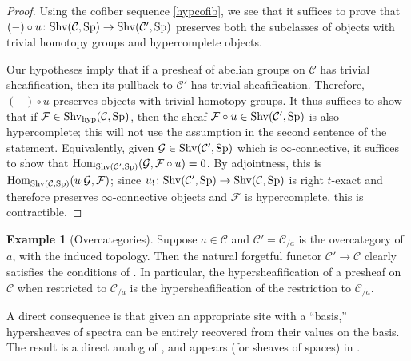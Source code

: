 \documentclass{amsart}
\newcommand{\sF}{\mathcal{F}}
\renewcommand{\sp}{\mathrm{Sp}}
\renewcommand{\hom}{\mathrm{Hom}}
\theoremstyle{definition}
\newtheorem{example}[theorem]{Example}
\begin{document}
\begin{proof} 
Using the cofiber sequence \eqref{hypcofib}, we see that it suffices to prove
that $(-) \circ u \colon  \shv( \mathcal{C}, \sp) \to \shv(\mathcal{C}', \sp)$
preserves both the subclasses of objects with trivial homotopy groups and
hypercomplete objects. 


Our hypotheses imply that 
if a presheaf of abelian groups on $\mathcal{C}$ has trivial sheafification,
then 
its pullback to $\mathcal{C}'$ has trivial sheafification. 
Therefore, $(-) \circ u $ preserves objects with trivial homotopy groups. 
 It thus suffices to show that if $\sF \in \shvh(\mathcal{C}, \sp)$,
then the sheaf $\sF \circ u \in \shv(\mathcal{C}', \sp)$ is also hypercomplete;
this will not use the assumption in the second sentence of the statement.
Equivalently,  given $\mathcal{G} \in \shv(\mathcal{C}', 
\sp)$ which is $\infty$-connective, it suffices to show that $\hom_{\shv(\mathcal{C}', \sp)}(\mathcal{G}, \sF
\circ u) =0 $.  
By adjointness, this is $\hom_{\shv(\mathcal{C}, \sp)} ( u_! \mathcal{G},
\sF)$; since $u_! \colon \shv(\mathcal{C}', \sp) \to \shv(\mathcal{C}, \sp)$ is right $t$-exact and therefore preserves $\infty$-connective objects and $\sF$ is
hypercomplete, this is contractible. 
\end{proof} 

\begin{example}[Overcategories] 
\label{overcat:ex}
Suppose $a \in \mathcal{C}$ and $\mathcal{C}' = \mathcal{C}_{/a}$ is the
overcategory of $a$, with the induced topology. Then the natural forgetful functor $\mathcal{C}' \to
\mathcal{C}$ clearly satisfies the conditions of 
. In particular, the hypersheafification of a
presheaf on $\mathcal{C}$ when restricted to $\mathcal{C}_{/a}$ is the
hypersheafification
of the restriction to $\mathcal{C}_{/a}$. 
\end{example} 



A direct consequence is that given an appropriate site with a ``basis,'' 
hypersheaves of spectra can be entirely recovered from their values on the
basis. 
The result is a direct analog of \cite[Th.~4.1, Exp.~III]{SGA4}, and appears
(for sheaves of spaces) in
\cite[App.~A]{Aoki}. 
\end{document}
